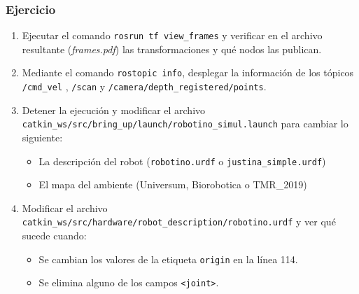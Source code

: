 \documentclass[10pt,spanish,aspectratio=1610]{beamer}
\begin{document}
\begin{frame}\frametitle{Ejercicio}
  \begin{enumerate}
  \item Ejecutar el comando \texttt{rosrun tf view\_frames} y verificar en el archivo resultante (\textit{frames.pdf}) las transformaciones y qué nodos las publican.
  \item Mediante el comando \texttt{rostopic info}, desplegar la información de los tópicos \texttt{/cmd\_vel} , \texttt{/scan} y \texttt{/camera/depth\_registered/points}.
  \item Detener la ejecución y modificar el archivo \texttt{catkin\_ws/src/bring\_up/launch/robotino\_simul.launch} para cambiar lo siguiente:
  \begin{itemize}
  \item La descripción del robot (\texttt{robotino.urdf} o \texttt{justina\_simple.urdf})
  \item El mapa del ambiente (Universum, Biorobotica o TMR\_2019)
  \end{itemize}
  \item Modificar el archivo \texttt{catkin\_ws/src/hardware/robot\_description/robotino.urdf} y ver qué sucede cuando:
  \begin{itemize}
  \item Se cambian los valores de la etiqueta \texttt{origin} en la línea 114.
  \item Se elimina alguno de los campos \texttt{<joint>}.
  \end{itemize}
\end{enumerate}
\end{frame}

\end{document}

